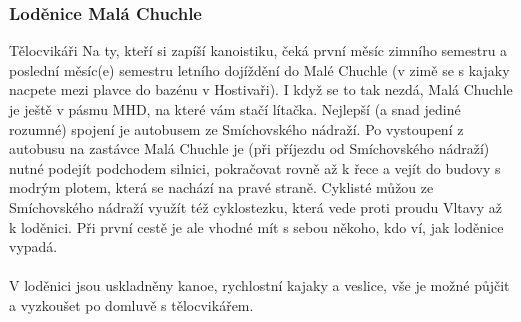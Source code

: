 \subsubsection{Loděnice Malá Chuchle}
{Tělocvikáři}
Na ty, kteří si zapíší kanoistiku, čeká první měsíc zimního semestru a poslední
měsíc(e) semestru letního dojíždění do Malé Chuchle (v zimě se s kajaky nacpete
mezi plavce do bazénu v Hostivaři). I když se to tak nezdá, Malá Chuchle je
ještě v pásmu MHD, na které vám stačí lítačka. Nejlepší (a snad jediné rozumné)
spojení je autobusem ze Smíchovského nádraží. Po vystoupení z autobusu na
zastávce Malá Chuchle je (při příjezdu od Smíchovského nádraží) nutné podejít
podchodem silnici, pokračovat rovně až k řece a vejít do budovy s modrým plotem,
která se nachází na pravé straně. Cyklisté můžou ze Smíchovského nádraží využít
též cyklostezku, která vede proti proudu Vltavy až k loděnici. Při první cestě
je ale vhodné mít s sebou někoho, kdo ví, jak loděnice vypadá.
\\\\
V loděnici jsou uskladněny kanoe, rychlostní kajaky a veslice, vše je možné
půjčit a vyzkoušet po domluvě s tělocvikářem.